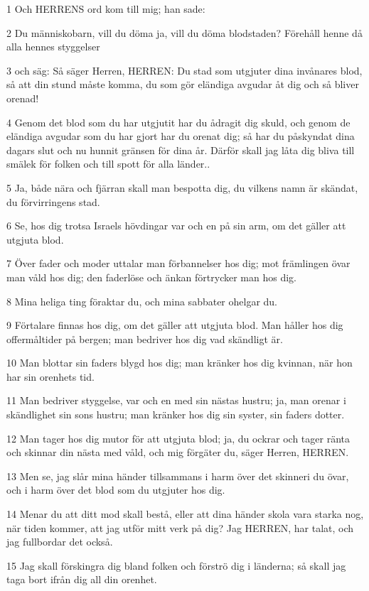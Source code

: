 \par 1 Och HERRENS ord kom till mig; han sade:
\par 2 Du människobarn, vill du döma ja, vill du döma blodstaden? Förehåll henne då alla hennes styggelser
\par 3 och säg: Så säger Herren, HERREN: Du stad som utgjuter dina invånares blod, så att din stund måste komma, du som gör eländiga avgudar åt dig och så bliver orenad!
\par 4 Genom det blod som du har utgjutit har du ådragit dig skuld, och genom de eländiga avgudar som du har gjort har du orenat dig; så har du påskyndat dina dagars slut och nu hunnit gränsen för dina år. Därför skall jag låta dig bliva till smälek för folken och till spott för alla länder..
\par 5 Ja, både nära och fjärran skall man bespotta dig, du vilkens namn är skändat, du förvirringens stad.
\par 6 Se, hos dig trotsa Israels hövdingar var och en på sin arm, om det gäller att utgjuta blod.
\par 7 Över fader och moder uttalar man förbannelser hos dig; mot främlingen övar man våld hos dig; den faderlöse och änkan förtrycker man hos dig.
\par 8 Mina heliga ting föraktar du, och mina sabbater ohelgar du.
\par 9 Förtalare finnas hos dig, om det gäller att utgjuta blod. Man håller hos dig offermåltider på bergen; man bedriver hos dig vad skändligt är.
\par 10 Man blottar sin faders blygd hos dig; man kränker hos dig kvinnan, när hon har sin orenhets tid.
\par 11 Man bedriver styggelse, var och en med sin nästas hustru; ja, man orenar i skändlighet sin sons hustru; man kränker hos dig sin syster, sin faders dotter.
\par 12 Man tager hos dig mutor för att utgjuta blod; ja, du ockrar och tager ränta och skinnar din nästa med våld, och mig förgäter du, säger Herren, HERREN.
\par 13 Men se, jag slår mina händer tillsammans i harm över det skinneri du övar, och i harm över det blod som du utgjuter hos dig.
\par 14 Menar du att ditt mod skall bestå, eller att dina händer skola vara starka nog, när tiden kommer, att jag utför mitt verk på dig? Jag HERREN, har talat, och jag fullbordar det också.
\par 15 Jag skall förskingra dig bland folken och förströ dig i länderna; så skall jag taga bort ifrån dig all din orenhet.
